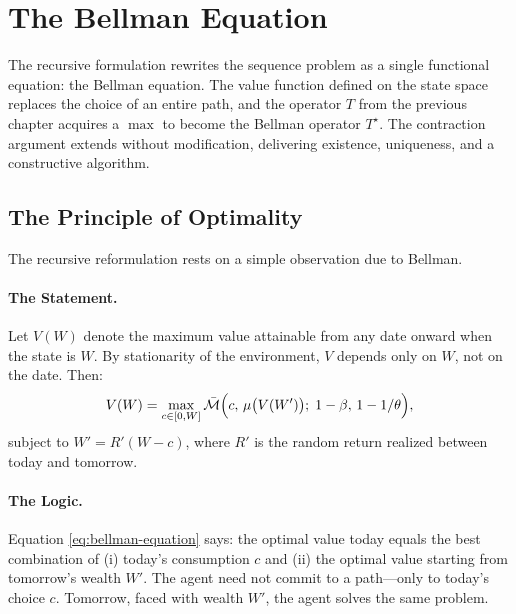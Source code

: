 \section{The Bellman Equation}
\label{sec:dp-bellman}

The recursive formulation rewrites the sequence problem as a single functional equation: the Bellman equation. The value function defined on the state space replaces the choice of an entire path, and the operator $T$ from the previous chapter acquires a $\max$ to become the Bellman operator $T^\star$. The contraction argument extends without modification, delivering existence, uniqueness, and a constructive algorithm.

\subsection{The Principle of Optimality}
\label{subsec:dp-principle}

The recursive reformulation rests on a simple observation due to Bellman.

\paragraph{The Statement.}
Let $V(W)$ denote the maximum value attainable from any date onward when the state is $W$. By stationarity of the environment, $V$ depends only on $W$, not on the date. Then:
\begin{equation}
V(W) = \max_{c \in [0, W]} \bar{\mathcal{M}}\Big( c, \, \mu\big( V(W') \big); \; 1-\beta, \, 1-1/\theta \Big),
\label{eq:bellman-equation}
\end{equation}
subject to $W' = R'(W - c)$, where $R'$ is the random return realized between today and tomorrow.

\paragraph{The Logic.}
Equation \cref{eq:bellman-equation} says: the optimal value today equals the best combination of (i) today's consumption $c$ and (ii) the optimal value starting from tomorrow's wealth $W'$. The agent need not commit to a path---only to today's choice $c$. Tomorrow, faced with wealth $W'$, the agent solves the same problem.

